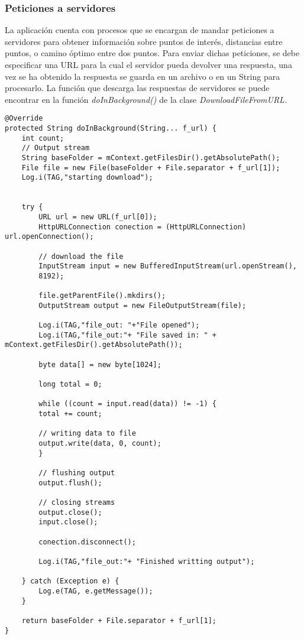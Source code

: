 \subsubsection{Peticiones a servidores}
La aplicación cuenta con procesos que se encargan de mandar peticiones a servidores para obtener información sobre puntos de interés, distancias entre puntos, o camino óptimo entre dos puntos. Para enviar dichas peticiones, se debe especificar una URL para la cual el servidor pueda devolver una respuesta, una vez se ha obtenido la respuesta se guarda en un archivo o en un String para procesarlo. La función que descarga las respuestas de servidores se puede encontrar en la función \textit{doInBackground()} de la clase \textit{DownloadFileFromURL.}
\begin{lstlisting}[caption=Función para enviar peticiones a servidores y guardar respuesta]
@Override
protected String doInBackground(String... f_url) {
	int count;
	// Output stream
	String baseFolder = mContext.getFilesDir().getAbsolutePath();
	File file = new File(baseFolder + File.separator + f_url[1]);
	Log.i(TAG,"starting download");
	
	
	try {
		URL url = new URL(f_url[0]);
		HttpURLConnection conection = (HttpURLConnection) url.openConnection();
		
		// download the file
		InputStream input = new BufferedInputStream(url.openStream(),
		8192);
		
		file.getParentFile().mkdirs();
		OutputStream output = new FileOutputStream(file);
		
		Log.i(TAG,"file_out: "+"File opened");
		Log.i(TAG,"file_out:"+ "File saved in: " + mContext.getFilesDir().getAbsolutePath());
		
		byte data[] = new byte[1024];
		
		long total = 0;
		
		while ((count = input.read(data)) != -1) {
		total += count;
		
		// writing data to file
		output.write(data, 0, count);
		}
		
		// flushing output
		output.flush();
		
		// closing streams
		output.close();
		input.close();
		
		conection.disconnect();
		
		Log.i(TAG,"file_out:"+ "Finished writting output");
	
	} catch (Exception e) {
		Log.e(TAG, e.getMessage());
	}
	
	return baseFolder + File.separator + f_url[1];
}
\end{lstlisting}

